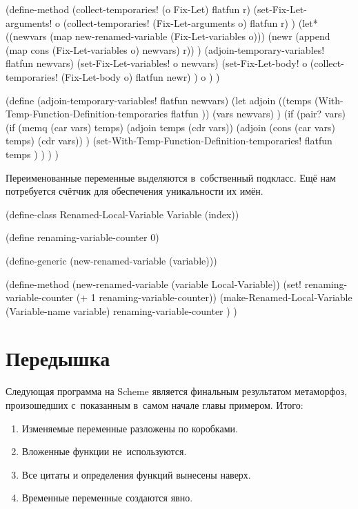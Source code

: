 \begin{code:lisp}
(define-method (collect-temporaries! (o Fix-Let) flatfun r)
  (set-Fix-Let-arguments!
   o (collect-temporaries! (Fix-Let-arguments o) flatfun r) )
  (let* ((newvars (map new-renamed-variable (Fix-Let-variables o)))
         (newr (append (map cons (Fix-Let-variables o) newvars) r)) )
    (adjoin-temporary-variables! flatfun newvars)
    (set-Fix-Let-variables! o newvars)
    (set-Fix-Let-body!
     o (collect-temporaries! (Fix-Let-body o) flatfun newr) )
    o ) )

(define (adjoin-temporary-variables! flatfun newvars)
  (let adjoin ((temps (With-Temp-Function-Definition-temporaries
                       flatfun ))
               (vars newvars) )
    (if (pair? vars)
        (if (memq (car vars) temps)
            (adjoin temps (cdr vars))
            (adjoin (cons (car vars) temps) (cdr vars)) )
        (set-With-Temp-Function-Definition-temporaries!
         flatfun temps ) ) ) )
\end{code:lisp}

Переименованные переменные выделяются в~собственный подкласс. Ещё нам
потребуется счётчик для обеспечения уникальности их имён.

\begin{code:lisp}
(define-class Renamed-Local-Variable Variable (index))

(define renaming-variable-counter 0)

(define-generic (new-renamed-variable (variable)))

(define-method (new-renamed-variable (variable Local-Variable))
  (set! renaming-variable-counter (+ 1 renaming-variable-counter))
  (make-Renamed-Local-Variable
   (Variable-name variable) renaming-variable-counter ) )
\end{code:lisp}


\section{Передышка}\label{cc/sect:pause}

Следующая программа на Scheme является финальным результатом метаморфоз,
произошедших с~показанным в~самом начале главы примером. Итого:

\begin{enumerate}
  \item Изменяемые переменные разложены по коробками.
  \item Вложенные функции не~используются.
  \item Все цитаты и определения функций вынесены наверх.
  \item Временные переменные создаются явно.
\end{enumerate}

